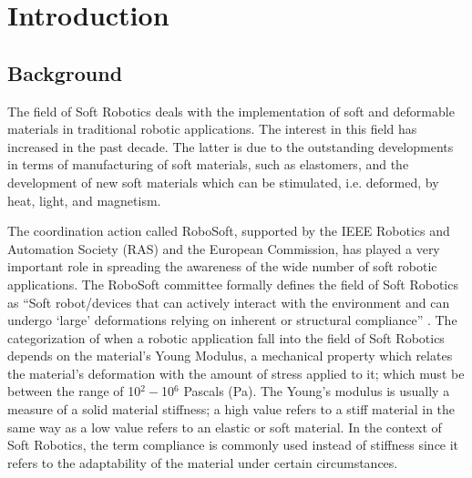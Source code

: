 \chapter{Introduction} \label{ch1:introduction}
\section{ Background}

The field of Soft Robotics deals with the implementation of soft and deformable materials in traditional robotic applications. The interest in this field has increased in the past decade. The latter is due to the outstanding developments in terms of manufacturing of soft materials, such as elastomers, and the development of new soft materials which can be stimulated, i.e. deformed, by heat, light, and magnetism. 

The coordination action called RoboSoft, supported by the IEEE Robotics and Automation Society (RAS) and the European Commission, has played a very important role in spreading the awareness of the wide number of soft robotic applications. The RoboSoft committee formally defines the field of Soft Robotics as ``Soft robot/devices that can actively interact with the environment and can undergo `large' deformations relying on inherent or structural compliance'' \cite{laschi2016soft}. The categorization of when a robotic application fall into the field of Soft Robotics depends on the material's Young Modulus, a mechanical property which relates the material's deformation with the amount of stress applied to it; which must be between the range of 10$^{2} - $10$^{6}$ Pascals (Pa). The Young's modulus is usually a measure of a solid material stiffness; a high value refers to a stiff material in the same way as a low value refers to an elastic or soft material. In the context of Soft Robotics, the term compliance is commonly used instead of stiffness since it refers to the adaptability of the material under certain circumstances.

